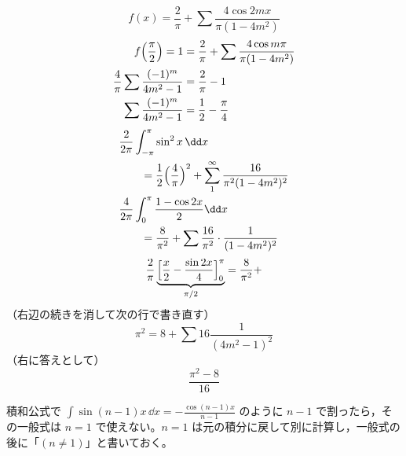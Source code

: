 \[ f(x)=\frac{2}{\pi}+\sum\frac{4\cos2mx}{\pi(1-4m^{2})} \]
\begin{align*}
  f\Bigl(\frac{\pi}{2}\Bigr)=1&=\frac{2}{\pi}+\sum\frac{4\cos m\pi}{\pi(1-4m^{2})}\\
  \frac{4}{\pi}\sum\frac{(-1)^{m}}{4m^{2}-1}&=\frac{2}{\pi}-1\\
  \sum\frac{(-1)^{m}}{4m^{2}-1}&=\frac{1}{2}-\frac{\pi}{4}
\end{align*}
\begin{align*}
  &\frac{2}{2\pi}\int_{-\pi}^{\pi}\sin^{2}x\,\dd x\\
  &\qquad=\frac{1}{2}\Bigl(\frac{4}{\pi}\Bigr)^{2}+\sum_{1}^{\infty}\frac{16}{\pi^{2}(1-4m^{2})^{2}}\\
  &\frac{4}{2\pi}\int_{0}^{\pi}\frac{1-\cos2x}{2}\dd x\\
  &\qquad=\frac{8}{\pi^{2}}+\sum\frac{16}{\pi^{2}}\cdot\frac{1}{(1-4m^{2})^{2}}
\end{align*}
\[ \frac{2}{\pi}\underbrace{\Bigl[\frac{x}{2}-\frac{\sin2x}{4}\Bigr]_{0}^{\pi}}_{\pi/2}=\frac{8}{\pi^{2}}+ \]
（右辺の続きを消して次の行で書き直す）
\[ \pi^{2}=8+\sum16\frac{1}{(4m^{2}-1)^{2}} \]
（右に答えとして）
\[ \frac{\pi^{2}-8}{16} \]
\item 積和公式で $\int\sin(n-1)x\,\dd x=-\frac{\cos(n-1)x}{n-1}$ のように $n-1$ で割ったら，その一般式は $n=1$ で使えない。$n=1$ は元の積分に戻して別に計算し，一般式の後に「$(n\neq1)$」と書いておく。
